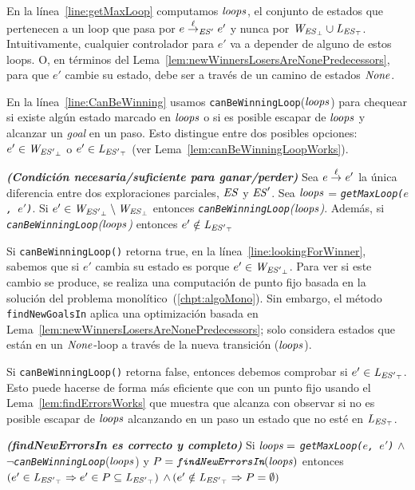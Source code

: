 En la línea~\ref{line:getMaxLoop} computamos $\mathit{loops}$, el conjunto de estados que pertenecen a un loop que pasa por $e \overset{\ell}{\rightarrow}_{\mathit{ES}'} e'$ y nunca por $\mathit{W_{\mathit{{\mathit{ES}}_{\bot}}}} \cup \mathit{L_{\mathit{{\mathit{ES}}_{\top}}}}$. 
Intuitivamente, cualquier controlador para $e'$ va a depender de alguno de estos loops. O, en términos del Lema~\ref{lem:newWinnersLosersAreNonePredecessors}, para que $e'$ cambie su estado, debe ser a través de un camino de estados $\mathit{None}$. 

En la línea~\ref{line:CanBeWinning} usamos \texttt{canBeWinningLoop}($\mathit{loops}$) para chequear si existe algún estado marcado en $\mathit{loops}$ o si es posible escapar de $\mathit{loops}$ y alcanzar un \textit{goal} en un paso. Esto distingue entre dos posibles opciones: $e' \in \mathit{W_{\mathit{{\mathit{ES}'}_{\bot}}}}$ o $e' \in \mathit{L_{\mathit{{\mathit{ES}'}_{\top}}}}$ (ver 
Lema~\ref{lem:canBeWinningLoopWorks}). 

\begin{lemma}\textbf{\emph{(Condición necesaria/suficiente para ganar/perder)}}
\label{lem:canBeWinningLoopWorks}
Sea $e \overset{\ell}{\rightarrow}_{} e'$ la única diferencia entre dos exploraciones parciales, 
$\mathit{ES}$ y $\mathit{ES}'$. Sea $\mathit{loops}$ = \emph{\texttt{getMaxLoop($e$, 
$e'$)}}.
Si $e' \in \mathit{W_{\mathit{{\mathit{ES}'}_{\bot}}}} \setminus \mathit{W_{\mathit{{\mathit{ES}}_{\bot}}}}$ 
entonces \emph{\texttt{canBeWinningLoop}($\mathit{loops}$)}. Además, si \\ 
\emph{\texttt{canBeWinningLoop}($\mathit{loops}$)} entonces $e' \notin \mathit{L_{\mathit{{\mathit{ES}'}_{\top}}}}$ 
\end{lemma}


Si \texttt{canBeWinningLoop()} retorna true, en la  línea~\ref{line:lookingForWinner}, 
sabemos que si $e'$ cambia su estado es porque $e' \in \mathit{W_{\mathit{{\mathit{ES}'}_{\bot}}}}$. Para ver si este cambio se produce, se realiza una computación de punto fijo basada en la solución del problema monolítico~(\ref{chpt:algoMono}). 
Sin embargo, el método \texttt{findNewGoalsIn} aplica una optimización basada en Lema~\ref{lem:newWinnersLosersAreNonePredecessors}; solo considera estados que están en un $\mathit{None}$-loop a través de la nueva transición ($\mathit{loops}$).

Si \texttt{canBeWinningLoop()} retorna false, entonces debemos comprobar si $e' \in \mathit{L_{\mathit{{\mathit{ES}'}_{\top}}}}$.
Esto puede hacerse de forma más eficiente que con un punto fijo usando el Lema~\ref{lem:findErrorsWorks} que muestra que alcanza con observar si no es posible escapar de $\mathit{loops}$ alcanzando en un paso un estado que no esté en $\mathit{L_{\mathit{{\mathit{ES}}_{\top}}}}$. 



\begin{lemma}\textbf{\emph{(findNewErrorsIn es correcto y completo)}}
\label{lem:findErrorsWorks}
Si $\mathit{loops} =$ \emph{\texttt{getMaxLoop($e$, $e'$)}} $\wedge$
$\neg$\emph{\texttt{canBeWinningLoop}}($\mathit{loops}$) y 
$P=\emph{\texttt{findNewErrorsIn}}(\mathit{loops})$ entonces 
$(e' \in \mathit{L_{\mathit{{\mathit{ES}'}_{\top}}}} \Rightarrow e' \in P 
\subseteq \mathit{L_{\mathit{{\mathit{ES}'}_{\top}}}})$ $\wedge \, (e' \notin \mathit{L_{\mathit{{\mathit{ES}'}_{\top}}}} \Rightarrow P = 
\emptyset)$
\end{lemma}



